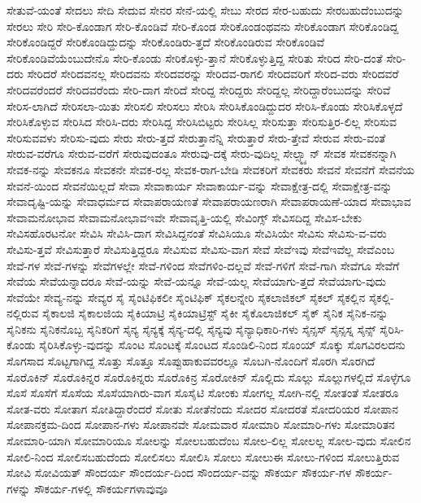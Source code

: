 {ಸೇತುವೆ-ಯಂತೆ
ಸೇದಲು
ಸೇದಿ
ಸೇದುವ
ಸೇನರ
ಸೇನೆ-ಯಲ್ಲಿ
ಸೇಬು
ಸೇರದ
ಸೇರ-ಬಹುದು
ಸೇರಬಹುದೆಂಬುದನ್ನು
ಸೇರಲು
ಸೇರಿ
ಸೇರಿ-ಕೊಂಡಾಗ
ಸೇರಿ-ಕೊಂಡಿವೆ
ಸೇರಿ-ಕೊಂಡ
ಸೇರಿಕೊಂಡಂಥವನು
ಸೇರಿಕೊಂಡಾಗ
ಸೇರಿಕೊಂಡಿದ್ದ
ಸೇರಿಕೊಂಡಿದ್ದರೆ
ಸೇರಿಕೊಂಡಿದ್ದುದನ್ನು
ಸೇರಿಕೊಂಡಿರು-ತ್ತದೆ
ಸೇರಿಕೊಂಡಿರುವ
ಸೇರಿಕೊಂಡಿವೆ
ಸೇರಿಕೊಂಡಿವೆಯೆಂಬುದೇನೊ
ಸೇರಿ-ಕೊಂಡು
ಸೇರಿಕೊಳ್ಳು-ತ್ತಾನೆ
ಸೇರಿಕೊಳ್ಳುತ್ತಿದ್ದ
ಸೇರಿತು
ಸೇರಿದ
ಸೇರಿ-ದಂತೆ
ಸೇರಿ-ದರು
ಸೇರಿದರೆ
ಸೇರಿದವನಲ್ಲ
ಸೇರಿದವನು
ಸೇರಿದವರನ್ನು
ಸೇರಿದವ-ರಾಗಲಿ
ಸೇರಿದವರಿಗೆ
ಸೇರಿದ-ವರು
ಸೇರಿದವರೆ
ಸೇರಿದವರೆಂದರೆ
ಸೇರಿದವರೆಂದು
ಸೇರಿ-ದಾಗ
ಸೇರಿದೆ
ಸೇರಿದ್ದ
ಸೇರಿದ್ದರು
ಸೇರಿದ್ದಲ್ಲ
ಸೇರಿದ್ದಾರೆಂಬುದನ್ನು
ಸೇರಿವೆ
ಸೇರಿಸ-ಲಾಗಿದೆ
ಸೇರಿಸಲಾ-ಯಿತು
ಸೇರಿಸಲಿ
ಸೇರಿಸಲು
ಸೇರಿಸಿ
ಸೇರಿಸಿಕೊಂಡಿದ್ದುದರ
ಸೇರಿಸಿ-ಕೊಂಡು
ಸೇರಿಸಿಕೊಳ್ಳದೆ
ಸೇರಿಸಿಕೊಳ್ಳುವ
ಸೇರಿಸಿದ
ಸೇರಿಸಿ-ದರು
ಸೇರಿಸಿದ್ದ
ಸೇರಿಸಿಬಿಟ್ಟರು
ಸೇರಿಸಿಲ್ಲ
ಸೇರಿಸುತ್ತಾ
ಸೇರಿಸುತ್ತಿರ-ಲಿಲ್ಲ
ಸೇರಿಸುವ
ಸೇರಿಸುವವಳು
ಸೇರಿಸು-ವುದು
ಸೇರು
ಸೇರು-ತ್ತದೆ
ಸೇರುತ್ತಾನೆನ್ನಿ
ಸೇರುತ್ತಾರೆ
ಸೇರು-ತ್ತೇವೆ
ಸೇರುವ
ಸೇರು-ವಂತೆ
ಸೇರುವ-ವರೆಗೂ
ಸೇರುವ-ವರೆಗೆ
ಸೇರುವುದಂತೂ
ಸೇರುವು-ದಕ್ಕೆ
ಸೇರು-ವುದಿಲ್ಲ
ಸೇಲ್ಸ್ಮ್ಯಾನ್
ಸೇವಕ
ಸೇವಕನನ್ನಾಗಿ
ಸೇವಕ-ನನ್ನು
ಸೇವಕನೂ
ಸೇವಕನೇ
ಸೇವಕ-ರಲ್ಲ
ಸೇವಕ-ರಾಗ-ಬೇಡಿ
ಸೇವಕರಿಗೆ
ಸೇವಕರು
ಸೇವನೆ
ಸೇವನೆಗೆ
ಸೇವನೆಯ
ಸೇವನೆ-ಯಿಂದ
ಸೇವನೆಯಿಲ್ಲದೆ
ಸೇವಾ
ಸೇವಾಕಾರ್ಯ
ಸೇವಾಕಾರ್ಯ-ವನ್ನು
ಸೇವಾಕ್ಷೇತ್ರ-ದಲ್ಲಿ
ಸೇವಾಕ್ಷೇತ್ರ-ವನ್ನು
ಸೇವಾದೃಷ್ಟಿ-ಯನ್ನು
ಸೇವಾಧರ್ಮದ
ಸೇವಾಪರಾಯಣತೆ
ಸೇವಾಪರಾಯಣರಾಗಿ
ಸೇವಾಪರಾಯಣೆ-ಯಾದ
ಸೇವಾಭಾವ
ಸೇವಾಮನೋಭಾವ
ಸೇವಾಮನೋಭಾವಇವೇ
ಸೇವಾವೃತ್ತಿ-ಯಲ್ಲಿ
ಸೇವಿಂಗ್ಸ್
ಸೇವಿಸದಿದ್ದ
ಸೇವಿಸ-ಬೇಕು
ಸೇವಿಸಹೊರಟನೋ
ಸೇವಿಸಿ
ಸೇವಿಸಿ-ದಾಗ
ಸೇವಿಸಿದ್ದನಂತೆ
ಸೇವಿಸಿಯೂ
ಸೇವಿಸಿಯೇ
ಸೇವಿಸು
ಸೇವಿಸು-ವ-ವರು
ಸೇವಿಸು-ತ್ತವೆ
ಸೇವಿಸುತ್ತಾರೆ
ಸೇವಿಸುತ್ತಿದ್ದರೂ
ಸೇವಿಸುವ
ಸೇವಿಸು-ವಾಗ
ಸೇವೆ
ಸೇವೆಇವು
ಸೇವೆಇವೆಲ್ಲ
ಸೇವೆಎಂಬ
ಸೇವೆ-ಗಳ
ಸೇವೆ-ಗಳನ್ನು
ಸೇವೆಗಳಲ್ಲೇ
ಸೇವೆ-ಗಳಿಂದ
ಸೇವೆಗಳಿಂ-ದಲ್ಲವೆ
ಸೇವೆ-ಗಳಿಗೆ
ಸೇವೆ-ಗಾಗಿ
ಸೇವೆಗೂ
ಸೇವೆಗೆ
ಸೇವೆಯ
ಸೇವೆಯನ್ನಾದರೂ
ಸೇವೆ-ಯನ್ನು
ಸೇವೆ-ಯನ್ನೂ
ಸೇವೆ-ಯಲ್ಲ
ಸೇವೆಯಾಗು-ತ್ತದೆ
ಸೇವೆಯಾಗು-ವುದು
ಸೇವೆಯೇ
ಸೇವ್ಯ-ನನ್ನು
ಸೇವ್ಯರ
ಸೈ
ಸೈಂಟಿಫಿಕಲೀ
ಸೈಂಟಿಫಿಕ್
ಸೈಕಲನ್ನೇರಿ
ಸೈಕಲಾಜಿಕಲ್
ಸೈಕಲ್
ಸೈಕಲ್ಲಿನ
ಸೈಕಲ್ಲಿ-ನಲ್ಲಿರುವ
ಸೈಕಾಲಜಿ
ಸೈಕಾಲಜಿಯ
ಸೈಕಿಯಾಟ್ರಿ
ಸೈಕಿಯಾಟ್ರಿಸ್ಟ್
ಸೈಕೀ
ಸೈಕೊಲಾಜಿಕಲ್
ಸೈಕ್
ಸೈನಿಕ
ಸೈನಿಕ-ನನ್ನು
ಸೈನಿಕನು
ಸೈನಿಕನೊಬ್ಬ
ಸೈನಿಕರಿಗೆ
ಸೈನ್ಯ
ಸೈನ್ಯಕ್ಕೆ
ಸೈನ್ಯ-ದಲ್ಲಿ
ಸೈನ್ಯವು
ಸೈನ್ಯಾಧಿಕಾರಿ-ಗಳು
ಸೈನ್ಸಸ್
ಸೈನ್ಸಸ್ನ
ಸೈನ್ಸ್
ಸೈರಿಸಿ-ಕೊಂಡು
ಸೈರಿಸಿಕೊಳ್ಳು-ವುದನ್ನು
ಸೊಂಟ
ಸೊಂಟಕ್ಕೆ
ಸೊಂಟದ
ಸೊಂಡಿಲಿ-ನಿಂದ
ಸೊಂಯ್
ಸೊಕ್ಕು
ಸೊಗವಿರಲದನು
ಸೊಗಸಾದ
ಸೊಟ್ಟಗಾಗಿದ್ದ
ಸೊತ್ತು
ಸೊತ್ತೂ
ಸೊಪ್ಪುಹಾಕುವವರಲ್ಲೂ
ಸೊಬಗಿ-ನೊಂದಿಗೆ
ಸೊರಗಿ
ಸೊರಗಿದೆ
ಸೊರೊಕಿನ್
ಸೊರೊಕಿನ್ನರ
ಸೊರೊಕಿನ್ನರು
ಸೊರೊಕಿನ್ರ
ಸೊರೋಕಿನ್
ಸೊಲ್ಲಿದು
ಸೊಲ್ಲು
ಸೊಲ್ಲುಗಳಲ್ಲಿದೆ
ಸೊಳ್ಳೆಗೂ
ಸೊಸೆ
ಸೊಸೆಗೆ
ಸೊಸೆಯ
ಸೊಸೆಯಾಗಿರು-ವಾಗ
ಸೊಸೈಟಿ
ಸೋಂಕು
ಸೋಗಲ್ಲ
ಸೋಗಿ-ನಲ್ಲಿ
ಸೋತಂತೆ
ಸೋತರೂ
ಸೋತ-ವರು
ಸೋತಾಗ
ಸೋತಿದ್ದಾರೆಂದರೆ
ಸೋತು
ಸೋತೆನೆಂದು
ಸೋದರ
ಸೋದರತೆ
ಸೋದರಿಯರ
ಸೋಪಾನ
ಸೋಪಾನಕ್ರಮ-ದಿಂದ
ಸೋಪಾನ-ಗಳು
ಸೋಪಾನವೇ
ಸೋಮವಾರ
ಸೋಮಾರಿ
ಸೋಮಾರಿ-ಗಳು
ಸೋಮಾರಿತನ
ಸೋಮಾರಿ-ಯಾಗಿ
ಸೋಮಾರಿಯೂ
ಸೋಲನ್ನು
ಸೋಲಬಹುದೆಂಬ
ಸೋಲ-ಲಿಲ್ಲ
ಸೋಲಲ್ಲ
ಸೋಲ-ವುದು
ಸೋಲಿನ
ಸೋಲಿ-ನಿಂದ
ಸೋಲಿಸಬಹುದೆಂದು
ಸೋಲಿಸಲು
ಸೋಲಿಸಿ
ಸೋಲು
ಸೋಲುಈ
ಸೋಲು-ಗಳಿಂದ
ಸೋಲುತ್ತಿರುವ
ಸೋವಿ
ಸೋವಿಯತ್
ಸೌಂದರ್ಯ
ಸೌಂದರ್ಯ-ದಿಂದ
ಸೌಂದರ್ಯ-ವನ್ನು
ಸೌಕರ್ಯ
ಸೌಕರ್ಯ-ಗಳ
ಸೌಕರ್ಯ-ಗಳನ್ನು
ಸೌಕರ್ಯ-ಗಳಲ್ಲಿ
ಸೌಕರ್ಯಗಳಾವುವೂ
}
